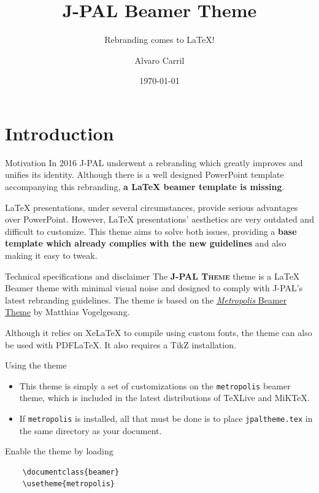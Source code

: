 \documentclass{beamer}
\title{J-PAL Beamer Theme}
\subtitle{Rebranding comes to \LaTeX!}
\date{\today}
\author{Alvaro Carril}
\institute{Abdul Latif Jameel Poverty Action Lab}
\newcommand{\jpalt}{\textbf{\textsc{J-PAL Theme}}\xspace}
\begin{document}
\maketitle

\section{Introduction}

\begin{frame}{Motivation}
In 2016 J-PAL underwent a rebranding which greatly improves and unifies its identity. Although there is a well designed PowerPoint template accompanying this rebranding, \textbf{a LaTeX beamer template is missing}.

LaTeX presentations, under several circumstances, provide serious advantages over PowerPoint. However, LaTeX presentations' aesthetics are very outdated and difficult to customize. This theme aims to solve both issues, providing a \textbf{base template which already complies with the new guidelines} and also making it easy to tweak.
\end{frame}

\begin{frame}{Technical specifications and disclaimer}
The \jpalt theme is a LaTeX Beamer theme with minimal visual noise and designed to comply with J-PAL's latest rebranding guidelines. The theme is based on the \href{https://github.com/matze/mtheme}{\textit{Metropolis} Beamer Theme} by Matthias Vogelgesang.

Although it relies on XeLaTeX to compile using custom fonts, the theme can also be used with PDFLaTeX. It also requires a TikZ installation.
\end{frame}

\begin{frame}[fragile]{Using the theme}
\begin{itemize}
	\item This theme is simply a set of customizations on the \texttt{metropolis} beamer theme, which is included in the latest distributions of TeXLive and MiKTeX.
	\item If \texttt{metropolis} is installed, all that must be done is to place \texttt{jpaltheme.tex} in the same directory as your document. 
\end{itemize}

Enable the theme by loading
 \begin{verbatim}    \documentclass{beamer}
    \usetheme{metropolis}
    \end{verbatim}
\end{frame}
\end{document}
